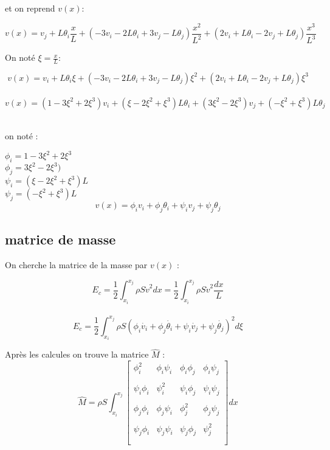 \documentclass[a4paper,10pt]{report} %
\begin{document}
et on reprend $v(x)$:

\begin{equation}
v(x)=v_j+L\theta_i\frac{x}{L}+(-3v_i-2L\theta_i+3v_j-L\theta_j)\frac{x^2}{L^2}+(2v_i+L\theta_i-2v_j+L\theta_j)\frac{x^3}{L^3}
\end{equation}

On noté $\xi=\frac{x}{L}$:
\begin{center}
$$v(x)=v_i+L\theta_i\xi+(-3v_i-2L\theta_i+3v_j-L\theta_j)\xi^2+(2v_i+L\theta_i-2v_j+L\theta_j)\xi^3 $$\\
$$v(x)=(1-3\xi^2+2\xi^3)v_i+(\xi-2\xi^2+\xi^3)L\theta_i+(3\xi^2-2\xi^3)v_j+(-\xi^2+\xi^3)L\theta_j$$\\
\end{center}


on noté :
\begin{center}
$\phi_i=1-3\xi^2+2\xi^3$\\$\phi_j=3\xi^2-2\xi^3)$\\$\psi_i=(\xi-2\xi^2+\xi^3)L$\\$\psi_j=(-\xi^2+\xi^3)L$\\
$$v(x)=\phi_iv_i+\phi_j\theta_i+\psi_iv_j+\psi_j\theta_j$$
\end{center}





\subsection{matrice de masse}
On cherche la matrice de la masse  par $v(x)$ :
\begin{center}
$$E_c=\frac{1}{2}\int_{x_i}^{x_j}\rho S\dot{v}^2dx=\frac{1}{2}\int_{x_i}^{x_j}\rho S\dot{v}^2\frac{dx}{L}$$\\
$$E_c=\frac{1}{2}\int_{x_i}^{x_j}\rho S(\phi_i\dot{v_i}+\phi_j\dot{\theta_i}+\psi_i\dot{v_j}+\psi_j\dot{\theta_j})^2d\xi$$
\end{center}

Après les calcules on trouve la matrice $\widehat{M}$ :
\[ \widehat{M}=\rho S\int_{x_i}^{x_j}\left[ \begin{array}{cccc}
\phi_i^2 &\phi_i\psi_i& \phi_i\phi_j&\phi_i\psi_j     \\\\
\psi_i\phi_i & \psi_i^2& \psi_i\phi_j&\psi_i\psi_j \\\\
\phi_j\phi_i &\phi_j\psi_i& \phi_j^2&\phi_j\psi_j     \\\\
\psi_j\phi_i &\psi_j\psi_i&\psi_j \phi_j&\psi_j^2    \\\\
 \end{array} \right]dx\]
\end{document}

